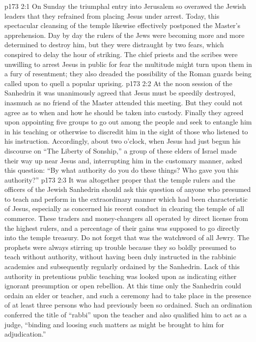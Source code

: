 \vs p173 2:1 On Sunday the triumphal entry into Jerusalem so overawed the Jewish leaders that they refrained from placing Jesus under arrest. Today, this spectacular cleansing of the temple likewise effectively postponed the Master’s apprehension. Day by day the rulers of the Jews were becoming more and more determined to destroy him, but they were distraught by two fears, which conspired to delay the hour of striking. The chief priests and the scribes were unwilling to arrest Jesus in public for fear the multitude might turn upon them in a fury of resentment; they also dreaded the possibility of the Roman guards being called upon to quell a popular uprising.
\vs p173 2:2 At the noon session of the Sanhedrin it was unanimously agreed that Jesus must be speedily destroyed, inasmuch as no friend of the Master attended this meeting. But they could not agree as to when and how he should be taken into custody. Finally they agreed upon appointing five groups to go out among the people and seek to entangle him in his teaching or otherwise to discredit him in the sight of those who listened to his instruction. Accordingly, about two o’clock, when Jesus had just begun his discourse on “The Liberty of Sonship,” a group of these elders of Israel made their way up near Jesus and, interrupting him in the customary manner, asked this question: “By what authority do you do these things? Who gave you this authority?”
\vs p173 2:3 It was altogether proper that the temple rulers and the officers of the Jewish Sanhedrin should ask this question of anyone who presumed to teach and perform in the extraordinary manner which had been characteristic of Jesus, especially as concerned his recent conduct in clearing the temple of all commerce. These traders and money\hyp{}changers all operated by direct license from the highest rulers, and a percentage of their gains was supposed to go directly into the temple treasury. Do not forget that  was the watchword of all Jewry. The prophets were always stirring up trouble because they so boldly presumed to teach without authority, without having been duly instructed in the rabbinic academies and subsequently regularly ordained by the Sanhedrin. Lack of this authority in pretentious public teaching was looked upon as indicating either ignorant presumption or open rebellion. At this time only the Sanhedrin could ordain an elder or teacher, and such a ceremony had to take place in the presence of at least three persons who had previously been so ordained. Such an ordination conferred the title of “rabbi” upon the teacher and also qualified him to act as a judge, “binding and loosing such matters as might be brought to him for adjudication.”\plusone
